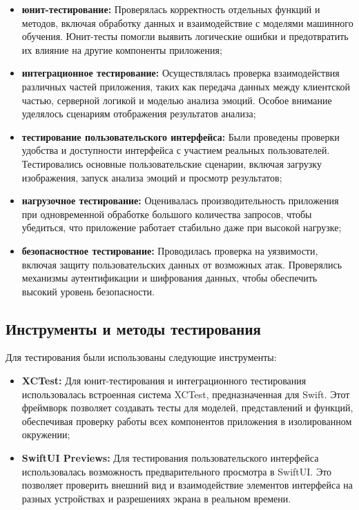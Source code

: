 {\begin{itemize}
    \item \textbf{юнит-тестирование:} Проверялась корректность отдельных функций и методов, включая обработку данных и взаимодействие с моделями машинного обучения. Юнит-тесты помогли выявить логические ошибки и предотвратить их влияние на другие компоненты приложения;
    \item \textbf{интеграционное тестирование:} Осуществлялась проверка взаимодействия различных частей приложения, таких как передача данных между клиентской частью, серверной логикой и моделью анализа эмоций. Особое внимание уделялось сценариям отображения результатов анализа;
    \item \textbf{тестирование пользовательского интерфейса:} Были проведены проверки удобства и доступности интерфейса с участием реальных пользователей. Тестировались основные пользовательские сценарии, включая загрузку изображения, запуск анализа эмоций и просмотр результатов;
    \item \textbf{нагрузочное тестирование:} Оценивалась производительность приложения при одновременной обработке большого количества запросов, чтобы убедиться, что приложение работает стабильно даже при высокой нагрузке;
    \item \textbf{безопасностное тестирование:} Проводилась проверка на уязвимости, включая защиту пользовательских данных от возможных атак. Проверялись механизмы аутентификации и шифрования данных, чтобы обеспечить высокий уровень безопасности.
\end{itemize}

\subsection{Инструменты и методы тестирования}

Для тестирования были использованы следующие инструменты:

\begin{itemize}
    \item \textbf{XCTest:} Для юнит-тестирования и интеграционного тестирования использовалась встроенная система XCTest, предназначенная для Swift. Этот фреймворк позволяет создавать тесты для моделей, представлений и функций, обеспечивая проверку работы всех компонентов приложения в изолированном окружении;
    \item \textbf{SwiftUI Previews:} Для тестирования пользовательского интерфейса использовалась возможность предварительного просмотра в SwiftUI. Это позволяет проверить внешний вид и взаимодействие элементов интерфейса на разных устройствах и разрешениях экрана в реальном времени.
\end{itemize}

}
